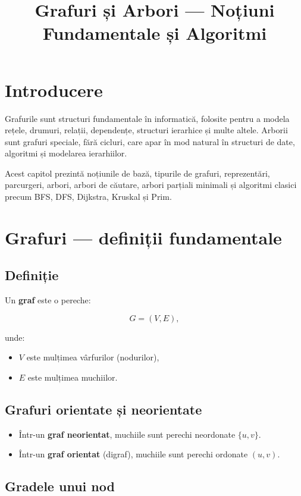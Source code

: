 \documentclass[12pt]{article}
\title{Grafuri și Arbori — Noțiuni Fundamentale și Algoritmi}
\author{}
\date{}
\begin{document}
\maketitle

\section{Introducere}

Grafurile sunt structuri fundamentale în informatică, folosite pentru a modela
rețele, drumuri, relații, dependențe, structuri ierarhice și multe altele.
Arborii sunt grafuri speciale, fără cicluri, care apar în mod natural în
structuri de date, algoritmi și modelarea ierarhiilor.

Acest capitol prezintă noțiunile de bază, tipurile de grafuri, reprezentări,
parcurgeri, arbori, arbori de căutare, arbori parțiali minimali și algoritmi
clasici precum BFS, DFS, Dijkstra, Kruskal și Prim.

\section{Grafuri — definiții fundamentale}

\subsection{Definiție}

Un \textbf{graf} este o pereche:


\[
G = (V, E),
\]


unde:
\begin{itemize}
    \item $V$ este mulțimea vârfurilor (nodurilor),
    \item $E$ este mulțimea muchiilor.
\end{itemize}

\subsection{Grafuri orientate și neorientate}

\begin{itemize}
    \item Într-un \textbf{graf neorientat}, muchiile sunt perechi neordonate $\{u,v\}$.
    \item Într-un \textbf{graf orientat} (digraf), muchiile sunt perechi ordonate $(u,v)$.
\end{itemize}

\subsection{Gradele unui nod}
\end{document}
